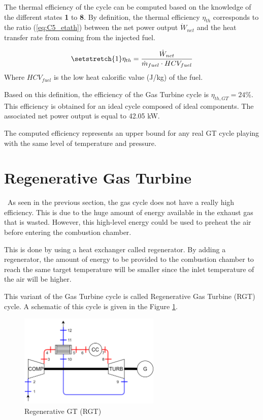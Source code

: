 The thermal efficiency of the cycle can be computed based on the knowledge of the different states \textbf{1} to \textbf{8}. By definition, the thermal efficiency $\eta_{th}$ corresponds to the ratio (\ref{eq:C5_etath}) between the net power output $\dot{W}_{net}$ and the heat transfer rate from coming from the injected fuel.

\begin{equation}
    \setstretch{1}
    \eta_{th} = \frac{\dot{W}_{net}}{\dot{m}_{fuel}\cdot HCV_{fuel}} \label{eq:C5_etath}
\end{equation}
Where $HCV_{fuel}$ is the low heat calorific value (J/kg) of the fuel.

Based on this definition, the efficiency of the Gas Turbine cycle is $\eta_{th,GT} =24$\%. This efficiency is obtained for an ideal cycle composed of ideal components. The associated net power output is equal to 42.05 kW. 

The computed efficiency represents an upper bound for any real GT cycle playing with the same level of temperature and pressure.

\section{Regenerative Gas Turbine}
\quad\, As seen in the previous section, the gas cycle does not have a really high efficiency. This is due to the huge amount of energy available in the exhaust gas that is wasted. However, this high-level energy could be used to preheat the air before entering the combustion chamber. 

This is done by using a heat exchanger called regenerator. By adding a regenerator, the amount of energy to be provided to the combustion chamber to reach the same target temperature will be smaller since the inlet temperature of the air will be higher.

This variant of the Gas Turbine cycle is called Regenerative Gas Turbine (RGT) cycle. A schematic of this cycle is given in the Figure \ref{fig:C5_RGT}.

\begin{figure}[h]
\centering
\includegraphics[width=0.6\textwidth]{RGT}
\caption{Regenerative GT (RGT)}
\label{fig:C5_RGT}
\end{figure}

